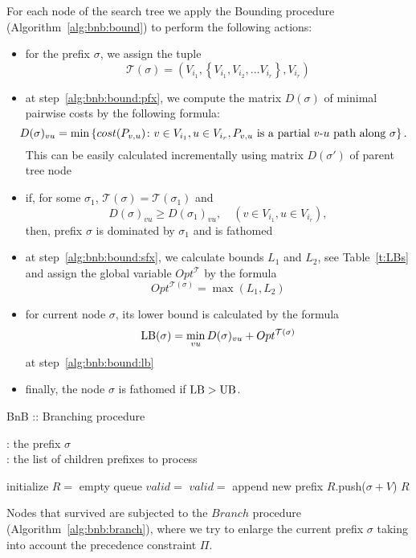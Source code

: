 For each node of the search tree
we apply
the Bounding procedure
(Algorithm~\ref{alg:bnb:bound})
to perform the following actions:
\begin{itemize}
    \item
    for the prefix $\sigma$,
    we assign the tuple
$$
\mathcal T(\sigma) = \left(V_{i_1},
        \left\{V_{i_1}, V_{i_2}, \dots V_{i_r}\right\}, V_{i_r} \right)
$$
    \item
    at step~\ref{alg:bnb:bound:pfx},
    we compute the matrix $D(\sigma)$ of minimal pairwise costs by the following formula:
    $$
    \hspace{-2ex}
    D(\sigma)_{vu} = \min\left\{
      cost(P_{v,u})\colon
      v \in V_{i_1},
      u \in V_{i_r},
      P_{v,u} \text{ is a partial $v$-$u$ path along } \sigma
    \right\}.
    $$
    This can be easily calculated
    incrementally using
    matrix $D(\sigma')$
    of parent tree node
    \item
    if, for some $\sigma_1$, $\mathcal T(\sigma) = \mathcal T(\sigma_1)$ and
    $$
    D(\sigma)_{vu} \ge D(\sigma_1)_{vu}, \quad
    (v \in V_{i_1}, u \in V_{i_r}),
    $$
    then,
    prefix $\sigma$ is dominated by $\sigma_1$
    and is fathomed
    \item
    at step~\ref{alg:bnb:bound:sfx},
    we calculate bounds $L_1$ and $L_2$,
    see Table~\ref{t:LBs} and assign the global variable
    $Opt^{\mathcal T}$ by the formula
    $$
    Opt^{\mathcal T(\sigma)} = \max(L_1, L_2)
    $$
    \item
    for current node $\sigma$,
    its lower bound is
    calculated by the formula
    $$
    \mathrm{LB}(\sigma) = \min_{vu}D(\sigma)_{vu} + Opt^{\mathcal T(\sigma)}
    $$
    at step~\ref{alg:bnb:bound:lb}
    \item
    finally, the node $\sigma$ is fathomed if $\mathrm{LB} > \mathrm{UB}$.
\end{itemize}

\begin{algorithm}
\caption{BnB :: Branching procedure}\label{alg:bnb:branch}
\hspace*{\algorithmicindent}{\bf Input}: the prefix $\sigma$ \\
\hspace*{\algorithmicindent}{\bf Output}: the list of children prefixes to process
\begin{algorithmic}[1]
    \STATE initialize $R =$ empty queue
        \STATE $valid =$ \TRUE
                \STATE $valid =$ \FALSE
            \ENDIF
        \ENDFOR
            \STATE append new prefix $R$.push($\sigma+V$)
        \ENDIF
    \ENDFOR
    \RETURN $R$
\end{algorithmic}
\end{algorithm}

Nodes that survived are subjected to the
$Branch$ procedure
(Algorithm~\ref{alg:bnb:branch}),
where we try to enlarge the current prefix
$\sigma$
taking into account the precedence constraint $\Pi$.
